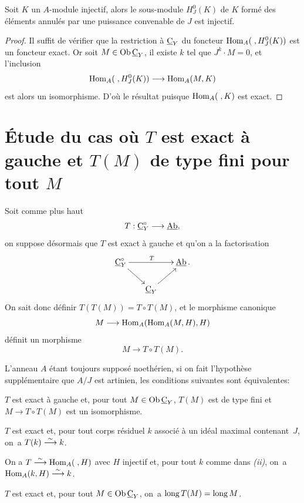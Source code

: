 \begin{corollaire} \label{IV.2.2}
Soit $K$ un $A$-module injectif, alors le sous-module $H^{0}_{J}(K)$ de $K$ form\'e des \'el\'ements annul\'es par une puissance convenable de $J$ est injectif.
\end{corollaire}

\begin{proof}
Il suffit de v\'erifier que la restriction \`a $\underline{\mathrm{C}}_{Y}$ du foncteur $ \operatorname{Hom}_{A}(\;, H^{0}_{J}(K))$ est un foncteur exact. Or soit $M\in \operatorname{Ob} \underline{\mathrm{C}}_{Y}$, il existe $k$ tel que $J^{k}\cdot M=0$, et l'inclusion
$$
\Hom_{A}(\;, H^{0}_{J}(K))\to \Hom_{A}(M, K)
$$
est alors un isomorphisme. D'o\`u le r\'esultat puisque $\operatorname{Hom}_{A}(\;, K)$ est exact.
\skipqed
\end{proof}

\section[\'Etude du cas o\`u $T$ est exact \`a gauche]
{\'Etude du cas o\`u $T$ est exact \`a gauche et $T(M)$ de type fini pour tout $M$} \label{IV.3}

Soit comme plus haut
\begin{equation*} T:\ccat_{Y}^{\circ}\to \Ab,
\end{equation*}
on suppose d\'esormais que $T$ est exact \`a gauche et qu'on a la factorisation
$$
\xymatrix@C=6mm@R=6mm{
{\ccat^{\circ}_{Y}}\ar[dr]\ar^{T}[rr]&&{\Ab\,.}\\
&{\ccat_{Y}}\ar[ur]&}
$$
 On sait donc d\'efinir $T(T(M))=T\circ T(M)$, et le morphisme canonique
$$
M\to \Hom_{A}(\Hom_{A}(M, H), H)
$$
d\'efinit un morphisme
$$
M\to T\circ T(M).
$$

\begin{proposition} \label{IV.3.1}
L'anneau $A$ \'etant toujours suppos\'e noeth\'erien, si on fait l'hypoth\`ese suppl\'ementaire que $A/J$ est artinien, les conditions suivantes sont \'equivalentes:
\begin{enumeratei}
\item
$T$ est exact \`a gauche et, pour tout $M\in \operatorname{Ob} \underline{\mathrm{C}}_{Y}$, $T(M)$ est de type fini et \hbox{$M\to T\circ T(M)$} est un isomorphisme.

\item
$T$ est exact et, pour tout corps r\'esiduel $k$ associ\'e \`a un id\'eal maximal contenant~$J$, on~a $T(k)\overset{\sim}{\longrightarrow} k$.

\item
On a $T\overset{\sim}{\longrightarrow} \operatorname{Hom}_{A}(\;, H)$ avec $H$ injectif et, pour tout $k$ comme dans \emph{(ii)}, on~a $\operatorname{Hom}_{A}(k, H)\overset{\sim}{\longrightarrow} k$.

\item
$T$ est exact et, pour tout $M\in \operatorname{Ob} \underline{\mathrm{C}}_{Y}$, on~a $\operatorname{long} T(M)=\operatorname{long} M$.
\end{enumeratei}
\end{proposition}

